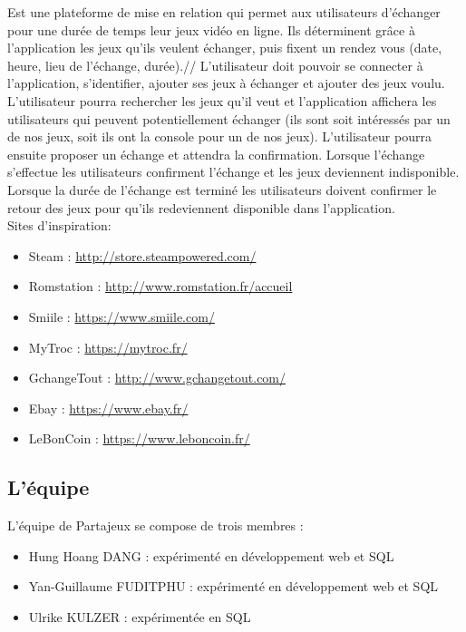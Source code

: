 \documentclass[a4paper,12pt,abstracton,titlepage]{scrartcl}
\begin{document}
Est une plateforme de mise en relation qui permet aux utilisateurs d'échanger
pour une durée de temps leur jeux vidéo en ligne. Ils déterminent grâce à
l'application les jeux qu'ils veulent échanger, puis fixent un rendez vous (date, heure, lieu de l'échange, durée).//
L'utilisateur doit pouvoir se connecter à l'application, s'identifier, ajouter ses jeux à échanger et ajouter des jeux voulu. L'utilisateur pourra rechercher les jeux qu'il veut et l'application affichera les utilisateurs qui peuvent potentiellement échanger (ils sont soit intéressés par un de nos jeux, soit ils ont la console pour un de nos jeux). L'utilisateur pourra ensuite proposer un échange et attendra la confirmation. Lorsque l'échange s'effectue les utilisateurs confirment l'échange et les jeux deviennent indisponible. Lorsque la durée de l'échange est terminé les utilisateurs doivent confirmer le retour des jeux pour qu'ils redeviennent disponible dans l'application.\\

Sites d'inspiration:\\
\begin{itemize}
\item Steam : 
\url{http://store.steampowered.com/}\\
\item Romstation : 
\url{http://www.romstation.fr/accueil}\\
\item Smiile : 
\url{https://www.smiile.com/}\\
\item MyTroc : 
\url{https://mytroc.fr/}\\
\item GchangeTout : 
\url{http://www.gchangetout.com/}\\
\item Ebay : 
\url{https://www.ebay.fr/}\\
\item LeBonCoin : 
\url{https://www.leboncoin.fr/}\\
\end{itemize}

\subsection{L'équipe}
L'équipe de Partajeux se compose de trois membres :\\
\begin{itemize}
\item Hung Hoang DANG : expérimenté en développement web et SQL\\
\item Yan-Guillaume FUDITPHU : expérimenté en développement web et SQL\\
\item Ulrike KULZER : expérimentée en SQL\\
\end{itemize}
\end{document}
